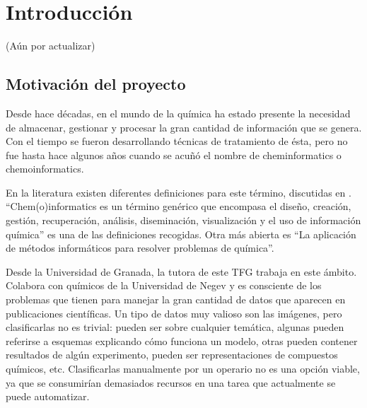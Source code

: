 \chapter{Introducción}




(Aún por actualizar)

\section{Motivación del proyecto}
Desde hace décadas, en el mundo de la química ha estado presente la necesidad de almacenar, gestionar y procesar la gran cantidad de información que se genera. Con el tiempo se fueron desarrollando técnicas de tratamiento de ésta, pero no fue hasta hace algunos años cuando se acuñó el nombre de cheminformatics o chemoinformatics. 

En la literatura existen diferentes definiciones para este término, discutidas en \cite{doi:10.1021/ci600234z}. ``Chem(o)informatics es un término genérico que encompasa el diseño, creación, gestión, recuperación, análisis, diseminación, visualización y el uso de información química'' es una de las definiciones recogidas. Otra más abierta es ``La aplicación de métodos informáticos para resolver problemas de química''. 

Desde la Universidad de Granada, la tutora de este TFG trabaja en este ámbito. Colabora con químicos de la Universidad de Negev y es consciente de los problemas que tienen para manejar la gran cantidad de datos que aparecen en publicaciones científicas. Un tipo de datos muy valioso son las imágenes, pero clasificarlas no es trivial: pueden ser sobre cualquier temática, algunas pueden referirse a esquemas explicando cómo funciona un modelo, otras pueden contener resultados de algún experimento, pueden ser representaciones de compuestos químicos, etc. Clasificarlas manualmente por un operario no es una opción viable, ya que se consumirían demasiados recursos en una tarea que actualmente se puede automatizar.


